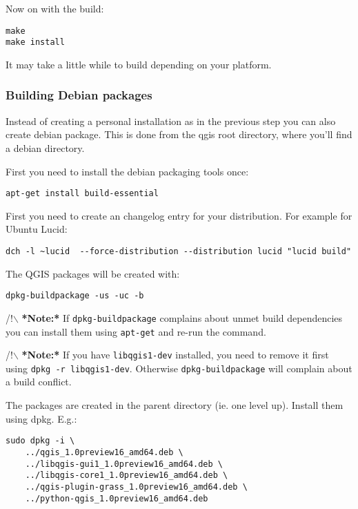 Now on with the build:

\begin{verbatim}
make
make install
\end{verbatim}

It may take a little while to build depending on your platform.

\hypertarget{toc52}{}
\subsubsection{Building Debian packages}
Instead of creating a personal installation as in the previous step you can
also create debian package.  This is done from the qgis root directory, where
you'll find a debian directory.

First you need to install the debian packaging tools once:

\begin{verbatim}
apt-get install build-essential
\end{verbatim}

First you need to create an changelog entry for your distribution. For example for Ubuntu Lucid:

\begin{verbatim}
dch -l ~lucid  --force-distribution --distribution lucid "lucid build"
\end{verbatim}

The QGIS packages will be created with:

\begin{verbatim}
dpkg-buildpackage -us -uc -b
\end{verbatim}

/!$\backslash$ \textbf{*Note:*} If \texttt{dpkg-buildpackage} complains about unmet build dependencies
you can install them using \texttt{apt-get} and re-run the command.

/!$\backslash$ \textbf{*Note:*} If you have \texttt{libqgis1-dev} installed, you need to remove it first
using \texttt{dpkg -r libqgis1-dev}.  Otherwise \texttt{dpkg-buildpackage} will complain about a
build conflict.

The packages are created in the parent directory (ie. one level up).
Install them using dpkg.  E.g.:

\begin{verbatim}
sudo dpkg -i \
	../qgis_1.0preview16_amd64.deb \
	../libqgis-gui1_1.0preview16_amd64.deb \
	../libqgis-core1_1.0preview16_amd64.deb \
	../qgis-plugin-grass_1.0preview16_amd64.deb \
	../python-qgis_1.0preview16_amd64.deb
\end{verbatim}

